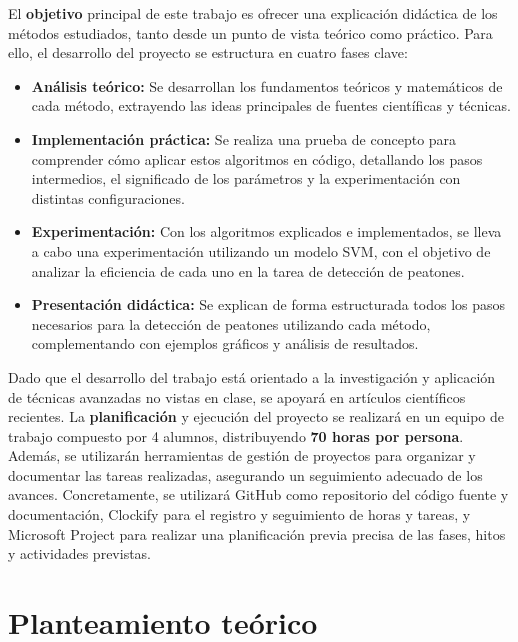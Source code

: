 \documentclass[a4paper]{article}
\begin{document}
 El \textbf{objetivo} principal de este trabajo es ofrecer una explicación didáctica de los métodos estudiados, tanto desde un punto de vista teórico como práctico. Para ello, el desarrollo del proyecto se estructura en cuatro fases clave: 
 \begin{itemize}
     \item \textbf{Análisis teórico:} Se desarrollan los fundamentos teóricos y matemáticos de cada método, extrayendo las ideas principales de fuentes científicas y técnicas.
     
     \item \textbf{Implementación práctica:} Se realiza una prueba de concepto para comprender cómo aplicar estos algoritmos en código, detallando los pasos intermedios, el significado de los parámetros y la experimentación con distintas configuraciones.
 
     \item \textbf{Experimentación:} Con los algoritmos explicados e implementados, se lleva a cabo una experimentación utilizando un modelo SVM, con el objetivo de analizar la eficiencia de cada uno en la tarea de detección de peatones.
 
     \item \textbf{Presentación didáctica:} Se explican de forma estructurada todos los pasos necesarios para la detección de peatones utilizando cada método, complementando con ejemplos gráficos y análisis de resultados.
 \end{itemize}
 
 Dado que el desarrollo del trabajo está orientado a la investigación y aplicación de técnicas avanzadas no vistas en clase, se apoyará en artículos científicos recientes. La \textbf{planificación} y ejecución del proyecto se realizará en un equipo de trabajo compuesto por 4 alumnos, distribuyendo \textbf{70 horas por persona}. Además, se utilizarán herramientas de gestión de proyectos para organizar y documentar las tareas realizadas, asegurando un seguimiento adecuado de los 
 avances. Concretamente, se utilizará GitHub como repositorio del código fuente y documentación, Clockify para el registro y seguimiento de horas y tareas, y Microsoft Project para realizar una planificación previa precisa de las fases, hitos y actividades previstas.
 \newpage

 \section{Planteamiento teórico}
 \par\vspace{0.5cm}
 
\end{document}
